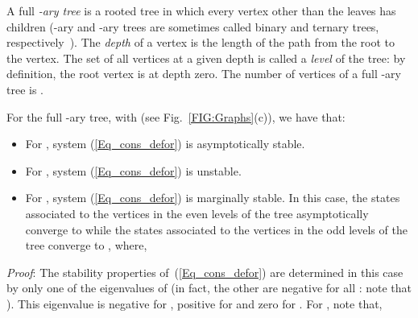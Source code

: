 \documentclass[letterpaper,9pt,twocolumn]{autart}
\begin{document}
A full \emph{-ary tree} is a rooted tree in which every vertex other than the leaves
has  children (-ary and -ary trees are sometimes called binary and ternary 
trees, respectively~\cite{GodsilRo_book01}).
The \emph{depth}  of a vertex is the length of the path from the root
to the vertex. The set of all vertices at a given depth is called a \emph{level} of the tree:
by definition, the root vertex is at depth zero. The number of vertices of a full -ary
tree is .\vspace{-0.12cm}
\begin{proposition}
For the full -ary tree, with  (see Fig.~\ref{FIG:Graphs}(c)), we have that:
\begin{itemize}
\item For , system (\ref{Eq_cons_defor}) is asymptotically stable.
\item For , system (\ref{Eq_cons_defor}) is unstable.
\item For , system (\ref{Eq_cons_defor}) is marginally stable.
In this case, the states associated to the vertices in the even levels of the tree asymptotically converge to 
while the states associated to the vertices in the odd levels of the tree converge to , where, 

\end{itemize}
\emph{Proof}:
The stability properties of~(\ref{Eq_cons_defor}) are determined in this case by only
one of the eigenvalues of  (in fact, the other  are
negative for all : note that ).
This eigenvalue is negative for , positive for  and
zero for . For , note that,

\end{proposition}
\end{document}
